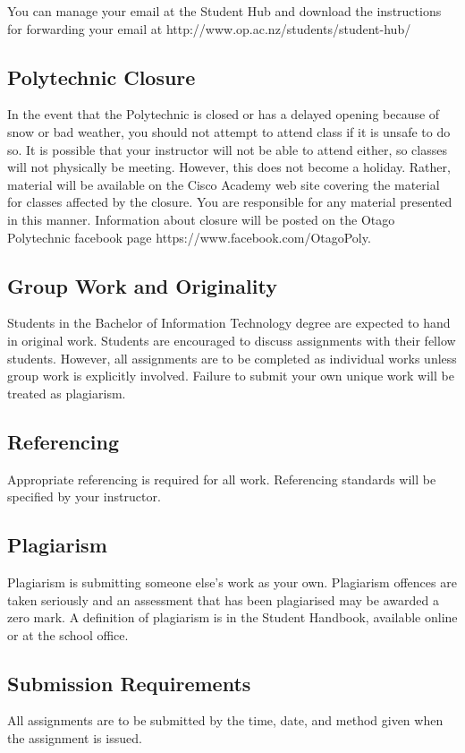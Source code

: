\documentclass{article}
\begin{document}
You can manage your email at the Student Hub and download the instructions for forwarding your email at http://www.op.ac.nz/students/student-hub/

\subsection*{Polytechnic Closure}
In the event that the Polytechnic is closed or has a delayed opening because of snow or bad weather, you should not attempt to attend class if it is unsafe to do so. It is possible that your instructor will not be able to attend either, so classes will not physically be meeting. However, this does not become a holiday. Rather, material will be available on the Cisco Academy web site covering the material for classes affected by the closure. You are responsible for any material presented in this manner. Information about closure will be posted on the Otago Polytechnic facebook page https://www.facebook.com/OtagoPoly.

\subsection*{Group Work and Originality}
Students in the Bachelor of Information Technology degree are expected to hand in original work.  Students are encouraged to discuss
assignments with their fellow students.  However, all assignments are to be completed as individual works unless group work is explicitly involved.
Failure to submit your own unique work will be treated as plagiarism.

\subsection*{Referencing}
Appropriate referencing is required for all work.  Referencing standards will be specified by your instructor.

\subsection*{Plagiarism}
Plagiarism is submitting someone else's work as your own.  Plagiarism offences are taken seriously and an
assessment that has been plagiarised may be awarded a zero mark.  A definition of plagiarism is in the Student Handbook,
available online or at the school office.

\subsection*{Submission Requirements}
All assignments are to be submitted by the time, date, and method given when the assignment is issued.
\end{document}
